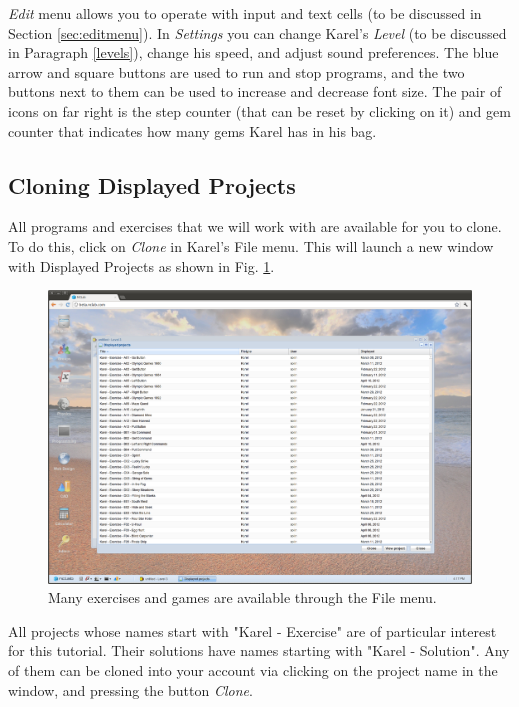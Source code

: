 \documentclass[article,A4,12pt]{llncs}
\begin{document}
{\em Edit} menu allows you to operate with input and text cells (to be discussed in 
Section \ref{sec:editmenu}). In {\em Settings} you can change Karel's {\em Level} (to be discussed
in Paragraph \ref{levels}), change his speed, and adjust sound preferences. The blue arrow and square 
buttons are used to run and stop programs, and the two buttons next to them can be used to increase and decrease 
font size. The pair of icons on far right is the step counter (that can be reset by clicking on it) and 
gem counter that indicates how many gems Karel has in his bag.

\subsection{Cloning Displayed Projects} \label{cloning}

All programs and exercises that we will work with are available for you to clone. 
To do this, click on {\em Clone} in Karel's File menu. This will launch a new window 
with Displayed Projects as shown in Fig. \ref{fig:cloning}.

\begin{figure}[!ht]
\begin{center}
\includegraphics[width=\textwidth]{img/cloning.png}
\end{center}
\caption{Many exercises and games are available through the File menu.}
\label{fig:cloning}
\end{figure}
\newpage
\noindent
All projects whose names start with "Karel - Exercise" are of particular interest 
for this tutorial. Their solutions have names starting with "Karel - Solution". 
Any of them can be cloned into your account via clicking on the project name in the window, 
and pressing the button {\em Clone}.
\end{document}
